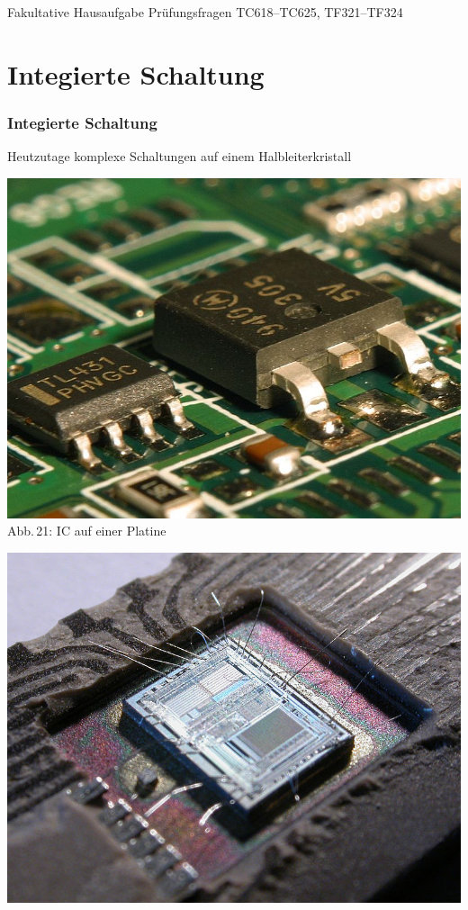 \begin{frame}
  \begin{exampleblock}{Fakultative Hausaufgabe}
    Prüfungsfragen TC618--TC625, TF321--TF324
  \end{exampleblock}
\end{frame}

\section*{Integierte Schaltung}
\begin{frame}
\frametitle{Integierte Schaltung}
Heutzutage komplexe Schaltungen auf einem Halbleiterkristall
\begin{minipage}{0.3\textwidth}
	\includegraphics[width=\textwidth,height=.6\textheight,keepaspectratio]{a06/IC.jpg}\\
	{\tiny Abb.\,21: IC auf einer Platine~\cite{wp}}
\end{minipage}
\hspace{0.5cm}
\begin{minipage}{0.5\textwidth}
\begin{center}
	\includegraphics[width=\textwidth,height=.6\textheight,keepaspectratio]{a06/IC2.jpg}\\

\end{center}
\end{minipage}
\end{frame}
